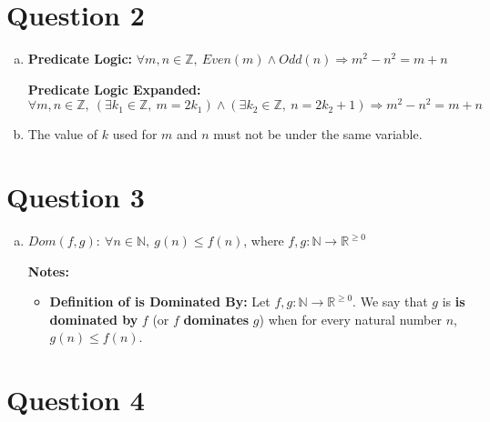 \documentclass[12pt]{article}
\begin{document}
\begin{itemize}


\end{itemize}

\section*{Question 2}
\begin{enumerate}[a.]
    \item

    \textbf{Predicate Logic:} $\forall m,n \in \mathbb{Z},\:Even(m) \land Odd(n) \Rightarrow m^2 - n^2 = m + n$

    \bigskip

    \textbf{Predicate Logic Expanded:} $\forall m,n \in \mathbb{Z},\:(\exists k_1
    \in \mathbb{Z},\:m = 2k_1) \land (\exists k_2 \in \mathbb{Z},\: n = 2k_2 + 1)
    \Rightarrow m^2 - n^2 = m + n$

    \item The value of $k$ used for $m$ and $n$ must not be under the same variable.

\end{enumerate}

\section*{Question 3}
\begin{enumerate}[a.]
    \item $Dom(f,g):\:\forall n \in \mathbb{N},\:g(n) \leq f(n)$, where $f,g:\mathbb{N} \to \mathbb{R}^{\geq 0}$

    \bigskip

    \textbf{Notes:}

    \begin{itemize}
        \item \textbf{Definition of is Dominated By:} Let $f,g:\mathbb{N} \to
        \mathbb{R}^{\geq 0}$. We say that $g$ is \textbf{is dominated by} $f$
        (or $f$ \textbf{dominates} $g$) when for every natural number $n$, $g(n) \leq f(n)$.
    \end{itemize}

\end{enumerate}

\section*{Question 4}
\end{document}
